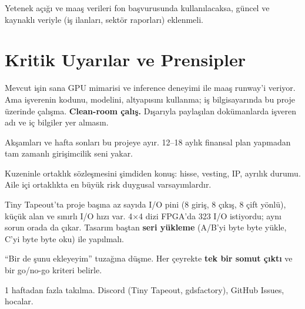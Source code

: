 \documentclass[11pt,a4paper]{article}
\begin{document}
\begin{notebox}
Yetenek açığı ve maaş verileri fon başvurusunda kullanılacaksa, güncel ve kaynaklı veriyle (iş ilanları, sektör raporları) eklenmeli.
\end{notebox}

\section{Kritik Uyarılar ve Prensipler}

\begin{warnbox}[IP Duvarı]
Mevcut işin sana GPU mimarisi ve inference deneyimi ile maaş runway'i veriyor. Ama işverenin kodunu, modelini, altyapısını kullanma; iş bilgisayarında bu proje üzerinde çalışma. \textbf{Clean-room çalış.} Dışarıyla paylaşılan dokümanlarda işveren adı ve iç bilgiler yer almasın.
\end{warnbox}

\begin{warnbox}
Akşamları ve hafta sonları bu projeye ayır. 12--18 aylık finansal plan yapmadan tam zamanlı girişimcilik seni yakar.
\end{warnbox}

\begin{warnbox}
Kuzeninle ortaklık sözleşmesini şimdiden konuş: hisse, vesting, IP, ayrılık durumu. Aile içi ortaklıkta en büyük risk duygusal varsayımlardır.
\end{warnbox}

\begin{notebox}
Tiny Tapeout'ta proje başına az sayıda I/O pini (8 giriş, 8 çıkış, 8 çift yönlü), küçük alan ve sınırlı I/O hızı var. 4$\times$4 dizi FPGA'da 323 I/O istiyordu; aynı sorun orada da çıkar. Tasarım baştan \textbf{seri yükleme} (A/B'yi byte byte yükle, C'yi byte byte oku) ile yapılmalı.
\end{notebox}

\begin{notebox}
``Bir de şunu ekleyeyim'' tuzağına düşme. Her çeyrekte \textbf{tek bir somut çıktı} ve bir go/no-go kriteri belirle.
\end{notebox}

\begin{notebox}
1 haftadan fazla takılma. Discord (Tiny Tapeout, gdsfactory), GitHub Issues, hocalar.
\end{notebox}
\end{document}
